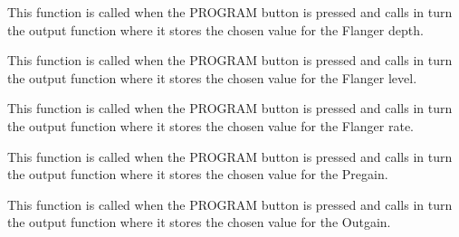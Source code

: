 \documentclass[letterpaper,10pt,english]{sphinxmanual}
\begin{document}

\begin{fulllineitems}
\label{Code:GUI.set_flangerDepth}
This function is called when the PROGRAM button is pressed and calls in turn the output function where it stores the chosen 
value for the Flanger depth.

\end{fulllineitems}


\begin{fulllineitems}
\label{Code:GUI.set_flangerLevel}
This function is called when the PROGRAM button is pressed and calls in turn the output function where it stores the chosen 
value for the Flanger level.

\end{fulllineitems}


\begin{fulllineitems}
\label{Code:GUI.set_flangerRate}
This function is called when the PROGRAM button is pressed and calls in turn the output function where it stores the chosen 
value for the Flanger rate.

\end{fulllineitems}


\begin{fulllineitems}
\label{Code:GUI.set_gain1}
This function is called when the PROGRAM button is pressed and calls in turn the output function where it stores the chosen 
value for the Pregain.

\end{fulllineitems}


\begin{fulllineitems}
\label{Code:GUI.set_gain2}
This function is called when the PROGRAM button is pressed and calls in turn the output function where it stores the chosen 
value for the Outgain.

\end{fulllineitems}
\end{document}
